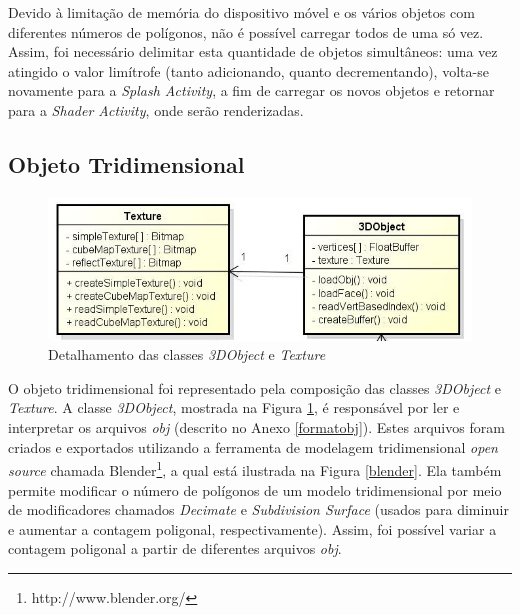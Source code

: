 	Devido à limitação de memória do dispositivo móvel e os vários objetos com diferentes números de polígonos, não é possível carregar todos de uma só vez. Assim, foi necessário delimitar esta quantidade de objetos simultâneos: uma vez atingido o valor limítrofe (tanto adicionando, quanto decrementando), volta-se novamente para a \textit{Splash Activity}, a fim de carregar os novos objetos e retornar para a \textit{Shader Activity}, onde serão renderizadas.

\subsection{Objeto Tridimensional}   

	\begin{figure}[ht]
	\centering
		\includegraphics[keepaspectratio=true,scale=0.6]{figuras/object_texture.jpg}
	\caption{Detalhamento das classes \textit{3DObject} e \textit{Texture}}
	\label{object_texture}
	\end{figure}

	O objeto tridimensional foi representado pela composição das classes \textit{3DObject} e \textit{Texture}. A classe \textit{3DObject}, mostrada na Figura \ref{object_texture}, é responsável por ler e interpretar os arquivos  \textit{obj}  (descrito no Anexo \ref{formatobj}). Estes arquivos foram criados e exportados utilizando a ferramenta de modelagem tridimensional \textit{open source} chamada Blender\footnote{http://www.blender.org/}, a qual está ilustrada na Figura \ref{blender}. Ela também permite modificar o número de polígonos de um modelo tridimensional por meio de modificadores chamados \textit{Decimate} e \textit{Subdivision Surface} (usados para diminuir e aumentar a contagem poligonal, respectivamente).  Assim, foi possível variar a contagem poligonal a partir de diferentes arquivos \textit{obj}.

